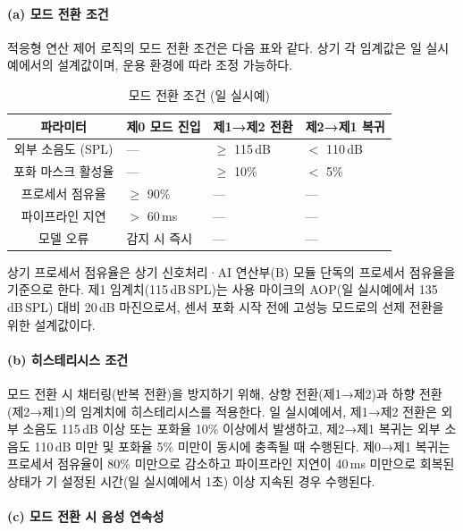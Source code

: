 \documentclass{article}
\begin{document}
\paragraph{(a) 모드 전환 조건}

적응형 연산 제어 로직의 모드 전환 조건은 다음 표와 같다. 상기 각 임계값은 일 실시예에서의 설계값이며, 운용 환경에 따라 조정 가능하다.

\begin{table}[H]
    \centering
    \renewcommand{\arraystretch}{1.3}
    \begin{tabular}{c|l|l|l}
        \hline
        \textbf{파라미터} & \textbf{제0 모드 진입} & \textbf{제1→제2 전환} & \textbf{제2→제1 복귀} \\
        \hline\hline
        외부 소음도 (SPL) & — & $\geq$ 115\,dB & $<$ 110\,dB \\
        \hline
        포화 마스크 활성율 & — & $\geq$ 10\% & $<$ 5\% \\
        \hline
        프로세서 점유율 & $\geq$ 90\% & — & — \\
        \hline
        파이프라인 지연 & $>$ 60\,ms & — & — \\
        \hline
        모델 오류 & 감지 시 즉시 & — & — \\
        \hline
    \end{tabular}
    \caption{모드 전환 조건 (일 실시예)}
\end{table}

상기 프로세서 점유율은 상기 신호처리·AI 연산부(B) 모듈 단독의 프로세서 점유율을 기준으로 한다. 제1 임계치(115\,dB\,SPL)는 사용 마이크의 AOP(일 실시예에서 135\,dB\,SPL) 대비 20\,dB 마진으로서, 센서 포화 시작 전에 고성능 모드로의 선제 전환을 위한 설계값이다.

\paragraph{(b) 히스테리시스 조건}

모드 전환 시 채터링(반복 전환)을 방지하기 위해, 상향 전환(제1→제2)과 하향 전환(제2→제1)의 임계치에 히스테리시스를 적용한다. 일 실시예에서, 제1→제2 전환은 외부 소음도 115\,dB 이상 또는 포화율 10\% 이상에서 발생하고, 제2→제1 복귀는 외부 소음도 110\,dB 미만 및 포화율 5\% 미만이 동시에 충족될 때 수행된다. 제0→제1 복귀는 프로세서 점유율이 80\% 미만으로 감소하고 파이프라인 지연이 40\,ms 미만으로 회복된 상태가 기 설정된 시간(일 실시예에서 1초) 이상 지속된 경우 수행된다.

\paragraph{(c) 모드 전환 시 음성 연속성}
\end{document}
